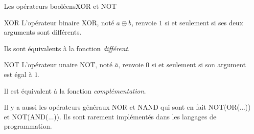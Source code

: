 \begin{frame}{Les opérateurs booléens}{XOR et NOT}
  \begin{block}{XOR}
    L'opérateur binaire XOR, noté $a\oplus b$, renvoie $1$ si et seulement si
    ses deux arguments sont différents.

    Ils sont équivalents à la fonction \emph{différent}.
  \end{block}
  \begin{block}{NOT}
    L'opérateur unaire NOT, noté $\overline{a}$, renvoie $0$ si et seulement
    si son argument est égal à $1$.

    Il est équivalent à la fonction \emph{complémentation}.

    Il y a aussi les opérateurs généraux NOR et NAND qui sont en fait
    NOT(OR(...)) et NOT(AND(...)). Ils sont rarement implémentés dans les
    langages de programmation.
  \end{block}
\end{frame}
